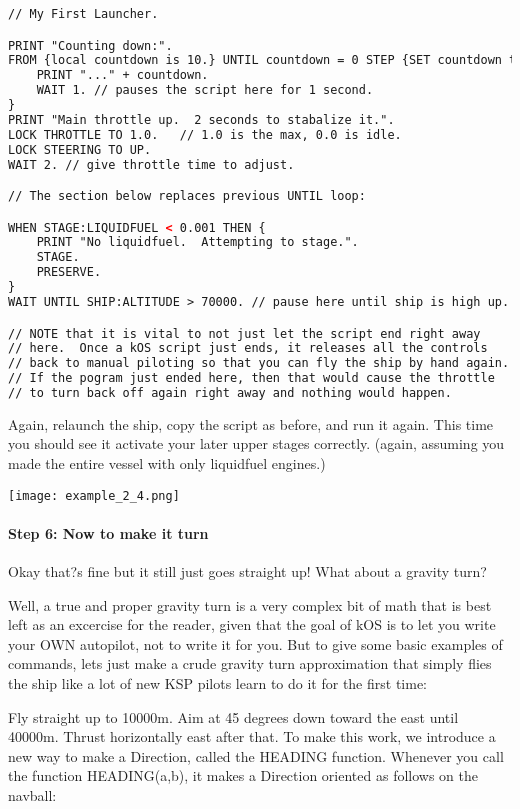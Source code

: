 \begin{lstlisting}[frame=single,language=XML]
// My First Launcher.

PRINT "Counting down:".
FROM {local countdown is 10.} UNTIL countdown = 0 STEP {SET countdown to countdown - 1.} DO {
    PRINT "..." + countdown.
    WAIT 1. // pauses the script here for 1 second.
}
PRINT "Main throttle up.  2 seconds to stabalize it.".
LOCK THROTTLE TO 1.0.   // 1.0 is the max, 0.0 is idle.
LOCK STEERING TO UP.
WAIT 2. // give throttle time to adjust.

// The section below replaces previous UNTIL loop:

WHEN STAGE:LIQUIDFUEL < 0.001 THEN {
    PRINT "No liquidfuel.  Attempting to stage.".
    STAGE.
    PRESERVE.
}
WAIT UNTIL SHIP:ALTITUDE > 70000. // pause here until ship is high up.

// NOTE that it is vital to not just let the script end right away
// here.  Once a kOS script just ends, it releases all the controls
// back to manual piloting so that you can fly the ship by hand again.
// If the pogram just ended here, then that would cause the throttle
// to turn back off again right away and nothing would happen.
\end{lstlisting} 
Again, relaunch the ship, copy the script as before, and run it again. This time you should see it activate your later upper stages correctly. (again, assuming you made the entire vessel with only liquidfuel engines.)

\begin{center}
\texttt{[image: example\_2\_4.png]}
\end{center}

\paragraph{Step 6: Now to make it turn}
Okay that?s fine but it still just goes straight up! What about a gravity turn?

Well, a true and proper gravity turn is a very complex bit of math that is best left as an excercise for the reader, given that the goal of kOS is to let you write your OWN autopilot, not to write it for you. But to give some basic examples of commands, lets just make a crude gravity turn approximation that simply flies the ship like a lot of new KSP pilots learn to do it for the first time:

Fly straight up to 10000m.
Aim at 45 degrees down toward the east until 40000m.
Thrust horizontally east after that.
To make this work, we introduce a new way to make a Direction, called the HEADING function. Whenever you call the function HEADING(a,b), it makes a Direction oriented as follows on the navball:

